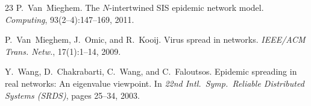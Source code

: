 \documentclass[11pt]{article}
\theoremstyle{definition}
\begin{document}
\begin{thebibliography}{23}
P.~Van~Mieghem.
\newblock The {$N$}-intertwined {SIS} epidemic network model.
\newblock \emph{Computing}, 93(2--4):147--169, 2011.

P.~Van~Mieghem, J.~Omic, and R.~Kooij.
\newblock Virus spread in networks.
\newblock \emph{IEEE/ACM Trans. Netw.}, 17(1):1--14, 2009.

Y.~Wang, D.~Chakrabarti, C.~Wang, and C.~Faloutsos.
\newblock Epidemic spreading in real networks: An eigenvalue viewpoint.
\newblock In \emph{22nd Intl.\ Symp.\ Reliable Distributed Systems (SRDS)}, pages 25--34, 2003.

\end{thebibliography}
\end{document}
